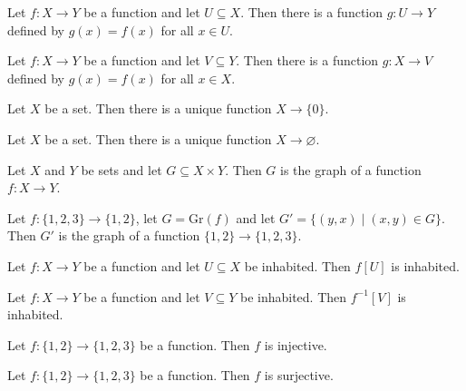 \begin{chapex} %
\label{cqFunctionsASNBegin}
Let $f : X \to Y$ be a function and let $U \subseteq X$. Then there is a function $g : U \to Y$ defined by $g(x) = f(x)$ for all $x \in U$.
\end{chapex}

\begin{chapex} %
Let $f : X \to Y$ be a function and let $V \subseteq Y$. Then there is a function $g : X \to V$ defined by $g(x) = f(x)$ for all $x \in X$.
\end{chapex}

\begin{chapex} %
Let $X$ be a set. Then there is a unique function $X \to \{ 0 \}$.
\end{chapex}

\begin{chapex} %
Let $X$ be a set. Then there is a unique function $X \to \varnothing$.
\end{chapex}

\begin{chapex} %
Let $X$ and $Y$ be sets and let $G \subseteq X \times Y$. Then $G$ is the graph of a function $f : X \to Y$.
\end{chapex}

\begin{chapex} %
Let $f : \{ 1, 2, 3 \} \to \{ 1, 2 \}$, let $G = \mathrm{Gr}(f)$ and let $G' = \{ (y,x) \mid (x,y) \in G \}$. Then $G'$ is the graph of a function $\{ 1, 2 \} \to \{ 1, 2, 3 \}$.
\end{chapex}

\begin{chapex} %
Let $f : X \to Y$ be a function and let $U \subseteq X$ be inhabited. Then $f[U]$ is inhabited.
\end{chapex}

\begin{chapex} %
Let $f : X \to Y$ be a function and let $V \subseteq Y$ be inhabited. Then $f^{-1}[V]$ is inhabited.
\end{chapex}

\begin{chapex} %
Let $f : \{ 1, 2 \} \to \{ 1, 2, 3 \}$ be a function. Then $f$ is injective.
\end{chapex}

\begin{chapex} %
Let $f : \{ 1, 2 \} \to \{ 1, 2, 3 \}$ be a function. Then $f$ is surjective.
\end{chapex}

